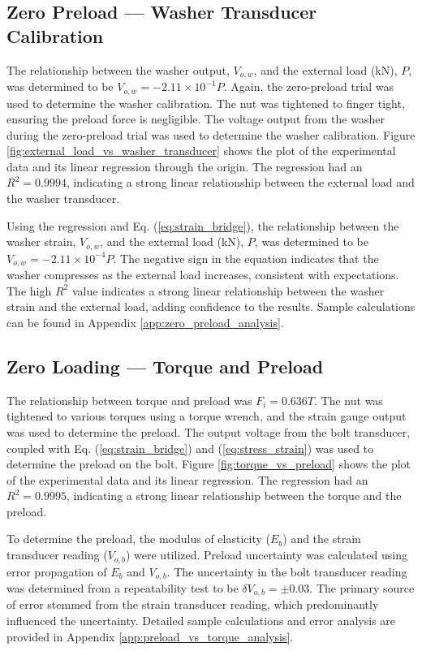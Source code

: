 \subsection{Zero Preload --- Washer Transducer Calibration}
The relationship between the washer output, $V_{o, w}$, and the external load (kN), $P$, was determined to be $V_{o, w} = -2.11 \times 10^{-1}P$. Again, the zero-preload trial was used to determine the washer calibration. The nut was tightened to finger tight, ensuring the preload force is negligible. The voltage output from the washer during the zero-preload trial was used to determine the washer calibration. Figure \ref{fig:external_load_vs_washer_transducer} shows the plot of the experimental data and its linear regression through the origin. The regression had an $R^2 = 0.9994$, indicating a strong linear relationship between the external load and the washer transducer.

Using the regression and Eq. (\ref{eq:strain_bridge}), the relationship between the washer strain, $V_{o, w}$, and the external load (kN), $P$, was determined to be $V_{o, w} = -2.11 \times 10^{-4}P$. The negative sign in the equation indicates that the washer compresses as the external load increases, consistent with expectations. The high $R^2$ value indicates a strong linear relationship between the washer strain and the external load, adding confidence to the results. Sample calculations can be found in Appendix \ref{app:zero_preload_analysis}.

\subsection{Zero Loading --- Torque and Preload}
\label{sec:zero_loading_torque_preload}
The relationship between torque and preload was $F_i = 0.636T$. The nut was tightened to various torques using a torque wrench, and the strain gauge output was used to determine the preload. The output voltage from the bolt transducer, coupled with Eq. (\ref{eq:strain_bridge}) and (\ref{eq:stress_strain}) was used to determine the preload on the bolt. Figure \ref{fig:torque_vs_preload} shows the plot of the experimental data and its linear regression. The regression had an $R^2 = 0.9995$, indicating a strong linear relationship between the torque and the preload. 

To determine the preload, the modulus of elasticity ($E_b$) and the strain transducer reading ($V_{o, b}$) were utilized. Preload uncertainty was calculated using error propagation of $E_b$ and $V_{o, b}$. The uncertainty in the bolt transducer reading was determined from a repeatability test to be $\delta V_{o, b} = \pm 0.03$. The primary source of error stemmed from the strain transducer reading, which predominantly influenced the uncertainty. Detailed sample calculations and error analysis are provided in Appendix \ref{app:preload_vs_torque_analysis}.

